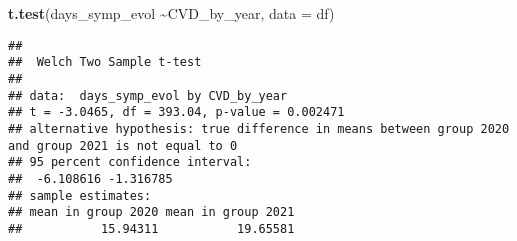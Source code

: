 \documentclass[
]{article}
\newenvironment{Shaded}{\begin{snugshade}}{\end{snugshade}}
\newcommand{\AttributeTok}[1]{\textcolor[rgb]{0.13,0.29,0.53}{#1}}
\newcommand{\FunctionTok}[1]{\textcolor[rgb]{0.13,0.29,0.53}{\textbf{#1}}}
\newcommand{\NormalTok}[1]{#1}
\newcommand{\SpecialCharTok}[1]{\textcolor[rgb]{0.81,0.36,0.00}{\textbf{#1}}}
\begin{document}
\begin{Shaded}
\begin{Highlighting}[]
\FunctionTok{t.test}\NormalTok{(days\_symp\_evol }\SpecialCharTok{\textasciitilde{}}\NormalTok{CVD\_by\_year, }\AttributeTok{data =}\NormalTok{ df)}
\end{Highlighting}
\end{Shaded}

\begin{verbatim}
## 
##  Welch Two Sample t-test
## 
## data:  days_symp_evol by CVD_by_year
## t = -3.0465, df = 393.04, p-value = 0.002471
## alternative hypothesis: true difference in means between group 2020 and group 2021 is not equal to 0
## 95 percent confidence interval:
##  -6.108616 -1.316785
## sample estimates:
## mean in group 2020 mean in group 2021 
##           15.94311           19.65581
\end{verbatim}
\end{document}
